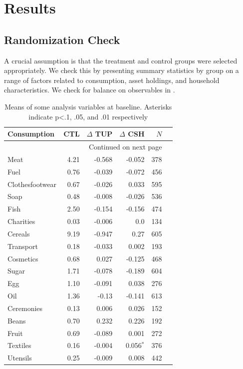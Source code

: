 \documentclass[12pt,article]{article}
\begin{document}
\section{Results}
\label{sec-3}
\subsection{Randomization Check}
\label{sec-3-1}

A crucial assumption is that the treatment and control groups were selected
appropriately. We check this by presenting summary statistics by group on a
range of factors related to consumption, asset holdings, and household
characteristics. We check for balance on observables in .

\begin{longtable}{lrrrrr}
\caption{\label{tab:balance_check}Means of some analysis variables at baseline.  Asterisks indicate p<.1, .05, and .01 respectively}
\\
\hline
Consumption & CTL & $\Delta$ TUP & $\Delta$ CSH & $N$\\
\hline
\endhead
\hline\multicolumn{5}{r}{Continued on next page} \\
\endfoot
\endlastfoot
Meat & 4.21 & -0.568 & -0.052 & 378\\
Fuel & 0.76 & -0.039 & -0.072 & 456\\
Clothesfootwear & 0.67 & -0.026 & 0.033 & 595\\
Soap & 0.48 & -0.008 & -0.026 & 536\\
Fish & 2.50 & -0.154 & -0.156 & 474\\
Charities & 0.03 & -0.006 & 0.0 & 134\\
Cereals & 9.19 & -0.947 & 0.27 & 605\\
Transport & 0.18 & -0.033 & 0.002 & 193\\
Cosmetics & 0.68 & 0.027 & -0.125 & 468\\
Sugar & 1.71 & -0.078 & -0.189 & 604\\
Egg & 1.10 & -0.091 & 0.038 & 276\\
Oil & 1.36 & -0.13 & -0.141 & 613\\
Ceremonies & 0.13 & 0.006 & 0.026 & 152\\
Beans & 0.70 & 0.232 & 0.226 & 192\\
Fruit & 0.69 & -0.089 & 0.001 & 272\\
Textiles & 0.16 & -0.004 & 0.056$^{\text{*}}$ & 376\\
Utensils & 0.25 & -0.009 & 0.008 & 442\\

\end{longtable}
\end{document}
